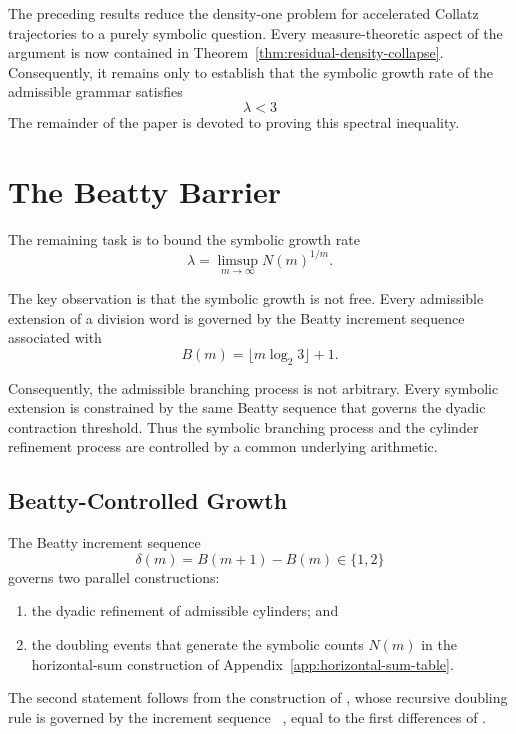 \documentclass[12pt, oneside]{article}
\numberwithin{equation}{section}
\theoremstyle{definition}
\theoremstyle{plain}
\theoremstyle{remark}
\begin{document}
The preceding results reduce the density-one problem for accelerated Collatz
trajectories to a purely symbolic question. Every measure-theoretic aspect of
the argument is now contained in Theorem~\ref{thm:residual-density-collapse}.
Consequently, it remains only to establish that the symbolic growth rate of
the admissible grammar satisfies
\[
\lambda < 3
\]
The remainder of the paper is devoted to proving this spectral inequality.


\section{The Beatty Barrier}
\label{sec:beatty-barrier}

The remaining task is to bound the symbolic growth rate
\[
\lambda = \limsup_{m\to\infty} N(m)^{1/m}.
\]

The key observation is that the symbolic growth is not free.
Every admissible extension of a division word is governed by
the Beatty increment sequence associated with
\[
B(m)=\lfloor m\log_2 3\rfloor+1.
\]

Consequently, the admissible branching process is not arbitrary.
Every symbolic extension is constrained by the same Beatty sequence that
governs the dyadic contraction threshold. Thus the symbolic branching
process and the cylinder refinement process are controlled by a common
underlying arithmetic.

\subsection{Beatty-Controlled Growth}

The Beatty increment sequence
\[
\delta(m)=B(m+1)-B(m)\in\{1,2\}
\]
governs two parallel constructions:

\begin{enumerate}
\item the dyadic refinement of admissible cylinders; and
\item the doubling events that generate the symbolic counts
      \(N(m)\) in the horizontal-sum construction of
      Appendix~\ref{app:horizontal-sum-table}.
\end{enumerate}

The second statement follows from the construction of ,
whose recursive doubling rule is governed by the increment sequence
 ~\cite{Winkler2017}, equal to the first differences of
.
\end{document}
